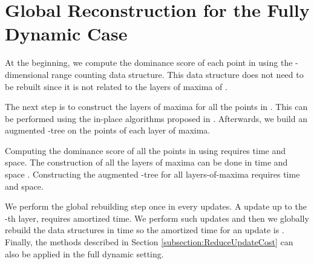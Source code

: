 \documentclass{llncs}
\begin{document}
\section{Global Reconstruction for the Fully Dynamic Case} \label{app:global}

At the beginning, we compute the dominance score of each point in  using the -dimensional range counting data structure. This data structure does not need to be rebuilt since it is not related to the layers of maxima of .

The next step is to construct the layers of maxima for all the points in . This can be performed using the in-place algorithms proposed in \cite{BlunckVAlgorithmica10}. Afterwards, we build an augmented -tree on the points of each layer of maxima.

Computing the dominance score of all the points in  using \cite{HeMunroWADS11} requires  time and  space. The construction of all the layers of maxima can be done in  time and  space \cite{BlunckVAlgorithmica10}. Constructing the augmented -tree for all layers-of-maxima requires  time and  space.

We perform the global rebuilding step once in every  updates. A update up to the -th layer, requires  amortized time. We perform  such updates and then we globally rebuild the data structures in  time so the amortized time for an update is . Finally, the methods described in Section \ref{subsection:ReduceUpdateCost} can also be applied in the full dynamic setting.
\end{document}
